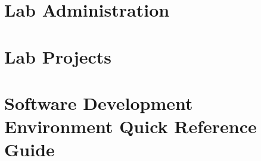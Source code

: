 \mainmatter

\part{Lab Administration}
\label{part_admin}


\part{Lab Projects}
\renewcommand{\chaptername}{Lab}
\label{part_proj_description}






\part{Software Development Environment Quick Reference Guide}
\label{part_ref}
\makeatletter
\renewcommand{\chaptername}{Chapter}
\renewcommand{\thefigure}{C\@arabic\c@figure}
\renewcommand{\thetable}{C\@arabic\c@table}
\makeatother


\appendix




